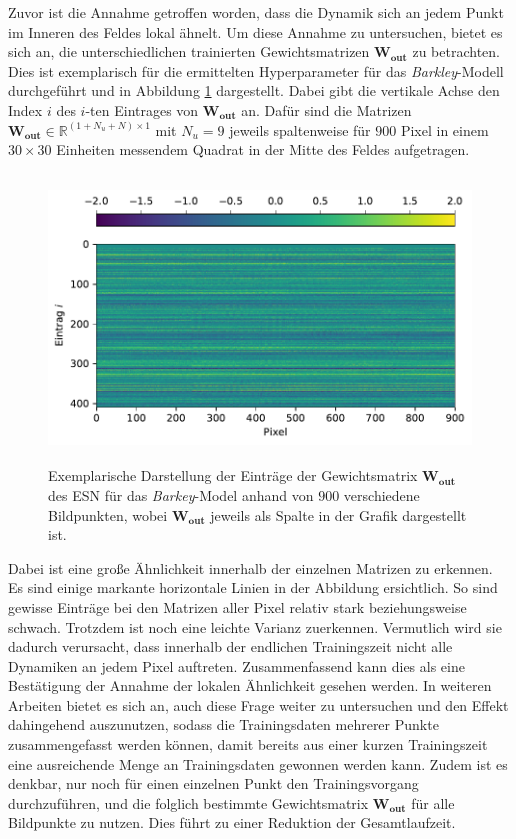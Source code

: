 Zuvor ist die Annahme getroffen worden, dass die Dynamik sich an jedem Punkt im Inneren des Feldes lokal ähnelt. Um diese Annahme zu untersuchen, bietet es sich an, die unterschiedlichen trainierten Gewichtsmatrizen $\mathbf{W_{out}}$ zu betrachten. Dies ist exemplarisch für die ermittelten Hyperparameter für das \textit{Barkley}-Modell durchgeführt und in Abbildung \ref{fig:exp_cross_esn_weights} dargestellt. Dabei gibt die vertikale Achse den Index $i$ des $i$-ten Eintrages von $\mathbf{W_{out}}$ an. Dafür sind die Matrizen $\mathbf{W_{out}} \in \mathbb{R}^{(1 + N_u + N) \times 1}$ mit $N_u = 9$ jeweils spaltenweise für $900$ Pixel in einem $30 \times 30$ Einheiten messendem Quadrat in der Mitte des Feldes aufgetragen.

\begin{figure}[H]
	\centering
	\includegraphics[height=3.0in]{figures/results/cross_prediction/weights.pdf}
	\setcapmargin[1cm]{1cm}
	\caption{Exemplarische Darstellung der Einträge der Gewichtsmatrix $\mathbf{W_{out}}$ des \textsc{ESN} für das \textit{Barkey}-Model anhand von $900$ verschiedene Bildpunkten, wobei $\mathbf{W_{out}}$ jeweils als Spalte in der Grafik dargestellt ist.}
	\label{fig:exp_cross_esn_weights}
\end{figure}



Dabei ist eine große Ähnlichkeit innerhalb der einzelnen Matrizen zu erkennen. Es sind einige markante horizontale Linien in der Abbildung ersichtlich. So sind gewisse Einträge bei den Matrizen aller Pixel relativ stark beziehungsweise schwach. Trotzdem ist noch eine leichte Varianz zuerkennen. Vermutlich wird sie dadurch verursacht, dass innerhalb der endlichen Trainingszeit nicht alle Dynamiken an jedem Pixel auftreten. Zusammenfassend kann dies als eine Bestätigung der Annahme der lokalen Ähnlichkeit gesehen werden. In weiteren Arbeiten bietet es sich an, auch diese Frage weiter zu untersuchen und den Effekt dahingehend auszunutzen, sodass die Trainingsdaten mehrerer Punkte zusammengefasst werden können, damit bereits aus einer kurzen Trainingszeit eine ausreichende Menge an Trainingsdaten gewonnen werden kann. Zudem ist es denkbar, nur noch für einen einzelnen Punkt den Trainingsvorgang durchzuführen, und die folglich bestimmte Gewichtsmatrix $\mathbf{W_{out}}$ für alle Bildpunkte zu nutzen. Dies führt zu einer Reduktion der Gesamtlaufzeit.

